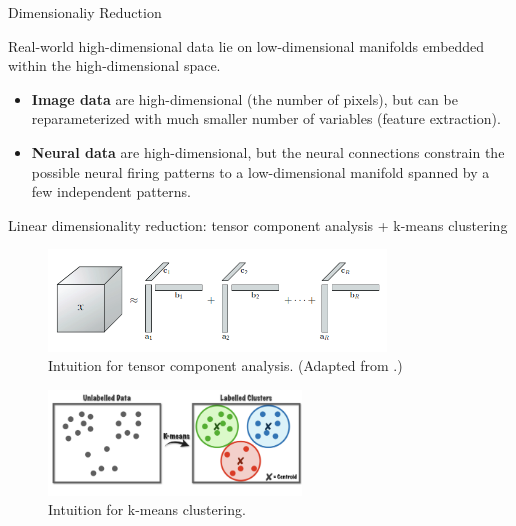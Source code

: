 \documentclass[xcolor={dvipsnames,svgnames}]{beamer}
\begin{document}
\begin{frame}{Dimensionaliy Reduction}
\begin{asm}
Real-world high-dimensional data lie on low-dimensional manifolds embedded within the high-dimensional space. \cite{deepai_2019}
\end{asm}
\begin{itemize}
    \item \textbf{Image data} are high-dimensional (the number of pixels), but can be reparameterized with much smaller number of variables (feature extraction).
    \item \textbf{Neural data} are high-dimensional, but the neural connections constrain the possible neural firing patterns to a low-dimensional manifold spanned by a few independent patterns. \cite{gallego_neural_2017}
\end{itemize}
\end{frame}


\begin{frame}{Linear dimensionality reduction: tensor component analysis + k-means clustering}
    \begin{figure}[H]
        \centering
            \includegraphics[width=0.8\textwidth]{figures-tensor/cp-decomp.png}
            \caption{Intuition for tensor component analysis. (Adapted from \cite{Kol2009}.)}
        \end{figure} 
    \begin{figure}[H]
        \centering
            \includegraphics[width=0.6\textwidth]{presentation/figures-tensor/kmeans.png}
            \caption{Intuition for k-means clustering.}
        \end{figure} 
\end{frame}
\end{document}
